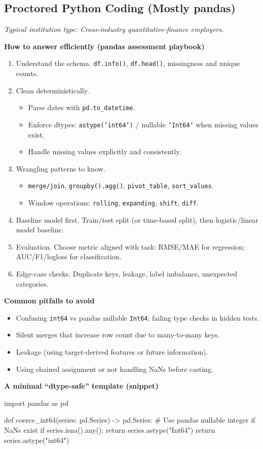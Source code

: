 \documentclass[11pt,letterpaper,openany]{book}
\newcommand{\RoleProfile}[2]{%
  \subsection{#1}%
  \noindent\textit{Typical institution type: #2.}\par
}
\begin{document}
\RoleProfile{Proctored Python Coding (Mostly pandas)}{Cross-industry quantitative-finance employers}
\textbf{How to answer efficiently (pandas assessment playbook)}
\begin{enumerate}
  \item Understand the schema. \texttt{df.info()}, \texttt{df.head()}, missingness and unique counts.
  \item Clean deterministically.
  \begin{itemize}
    \item Parse dates with \texttt{pd.to\_datetime}.
    \item Enforce dtypes: \texttt{astype('int64')} / nullable \texttt{'Int64'} when missing values exist.
    \item Handle missing values explicitly and consistently.
  \end{itemize}
  \item Wrangling patterns to know.
  \begin{itemize}
    \item \texttt{merge/join}, \texttt{groupby().agg()}, \texttt{pivot\_table}, \texttt{sort\_values}.
    \item Window operations: \texttt{rolling}, \texttt{expanding}, \texttt{shift}, \texttt{diff}.
  \end{itemize}
  \item Baseline model first. Train/test split (or time-based split), then logistic/linear model baseline.
  \item Evaluation. Choose metric aligned with task: RMSE/MAE for regression; AUC/F1/logloss for classification.
  \item Edge-case checks. Duplicate keys, leakage, label imbalance, unexpected categories.
\end{enumerate}

\textbf{Common pitfalls to avoid}
\begin{itemize}
  \item Confusing \texttt{int64} vs pandas nullable \texttt{Int64}; failing type checks in hidden tests.
  \item Silent merges that increase row count due to many-to-many keys.
  \item Leakage (using target-derived features or future information).
  \item Using chained assignment or not handling NaNs before casting.
\end{itemize}

\textbf{A minimal ``dtype-safe'' template (snippet)}
\begin{codeblock}
import pandas as pd

def coerce_int64(series: pd.Series) -> pd.Series:
    # Use pandas nullable integer if NaNs exist
    if series.isna().any():
        return series.astype("Int64")
    return series.astype("int64")
\end{codeblock}
\end{document}
